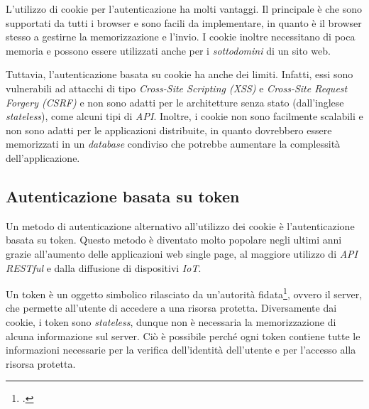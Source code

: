 \noindent L'utilizzo di cookie per l'autenticazione ha molti vantaggi.
Il principale è che sono supportati da tutti i browser e sono facili da implementare, in quanto è il browser stesso a gestirne la memorizzazione e l'invio.
I cookie inoltre necessitano di poca memoria e possono essere utilizzati anche per i \emph{sottodomini} di un sito web.

Tuttavia, l'autenticazione basata su cookie ha anche dei limiti.
Infatti, essi sono vulnerabili ad attacchi di tipo \emph{Cross-Site Scripting (XSS)} e \emph{Cross-Site Request Forgery (CSRF)} e non sono adatti per le architetture senza stato (dall'inglese \emph{stateless}), come alcuni tipi di \emph{\gls{API}}.
Inoltre, i cookie non sono facilmente scalabili e non sono adatti per le applicazioni distribuite, in quanto dovrebbero essere memorizzati in un \emph{database} condiviso che potrebbe aumentare la complessità dell'applicazione.

\subsection{Autenticazione basata su token}
Un metodo di autenticazione alternativo all'utilizzo dei cookie è l'autenticazione basata su token.
Questo metodo è diventato molto popolare negli ultimi anni grazie all'aumento delle applicazioni web single page, al maggiore utilizzo di \emph{\gls{API RESTful}} e dalla diffusione di dispositivi \emph{\gls{IoT}}.

Un token è un oggetto simbolico rilasciato da un'autorità fidata\footcite{site:token-based-authentication-cloudflare}, ovvero il server, che permette all'utente di accedere a una risorsa protetta.
Diversamente dai cookie, i token sono \emph{stateless}, dunque non è necessaria la memorizzazione di alcuna informazione sul server.
Ciò è possibile perché ogni token contiene tutte le informazioni necessarie per la verifica dell'identità dell'utente e per l'accesso alla risorsa protetta. \\

